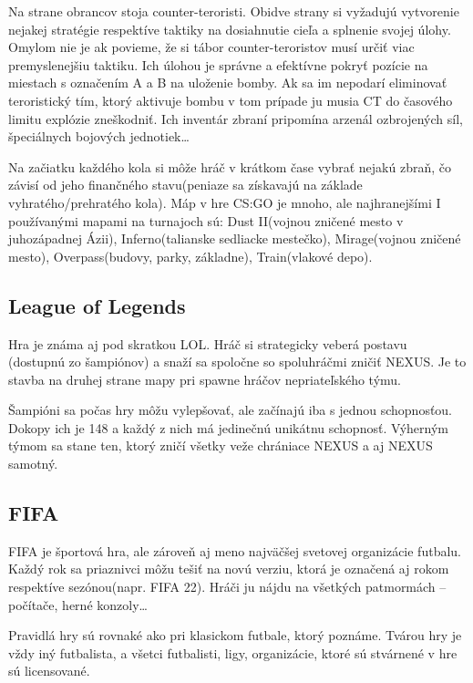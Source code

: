 \documentclass[10pt,oneside,slovak,a4paper]{article}
\begin{document}
Na strane obrancov stoja counter-teroristi. Obidve strany si vyžadujú vytvorenie nejakej stratégie respektíve taktiky na dosiahnutie cieľa a splnenie svojej úlohy. Omylom nie je ak povieme, že si tábor counter-teroristov musí určiť viac premyslenejšiu taktiku. Ich úlohou je správne a efektívne pokryť pozície na miestach s označením A a B na uloženie bomby. Ak sa im nepodarí eliminovať teroristický tím, ktorý aktivuje bombu v tom prípade ju musia CT do časového limitu explózie zneškodniť. Ich inventár zbraní pripomína arzenál ozbrojených síl, špeciálnych bojových jednotiek…\cite{a1} 

Na začiatku každého kola si môže hráč v krátkom čase vybrať nejakú zbraň, čo závisí od jeho finančného stavu(peniaze sa získavajú na základe vyhratého/prehratého kola). Máp v hre CS:GO je mnoho, ale najhranejšími I používanými mapami na turnajoch sú: Dust II(vojnou zničené mesto v juhozápadnej Ázii), Inferno(talianske sedliacke mestečko), Mirage(vojnou zničené mesto), Overpass(budovy, parky, základne), Train(vlakové depo).\cite{a1}


\subsection{League of Legends} \label{hry:lol}

Hra je známa aj pod skratkou LOL. Hráč si strategicky veberá postavu (dostupnú zo šampiónov) a snaží sa spoločne so spoluhráčmi zničiť NEXUS. Je to stavba na druhej strane mapy pri spawne hráčov nepriateľského týmu. 

Šampióni sa počas hry môžu vylepšovať, ale začínajú iba s jednou schopnosťou. Dokopy ich je 148 a každý z nich má jedinečnú unikátnu schopnosť. Výherným týmom sa stane ten, ktorý zničí všetky veže chrániace NEXUS a aj NEXUS samotný. \cite{a1}

\subsection{FIFA} \label{hry:fifa}

FIFA je športová hra, ale zároveň aj meno najväčšej svetovej organizácie futbalu. Každý rok sa priaznivci môžu tešiť na novú verziu, ktorá je označená aj rokom respektíve sezónou(napr. FIFA 22). Hráči ju nájdu na všetkých patmormách – počítače, herné konzoly… 

Pravidlá hry sú rovnaké ako pri klasickom futbale, ktorý poznáme. Tvárou hry je vždy iný futbalista, a všetci futbalisti, ligy, organizácie, ktoré sú stvárnené v hre sú licensované. 
\end{document}
